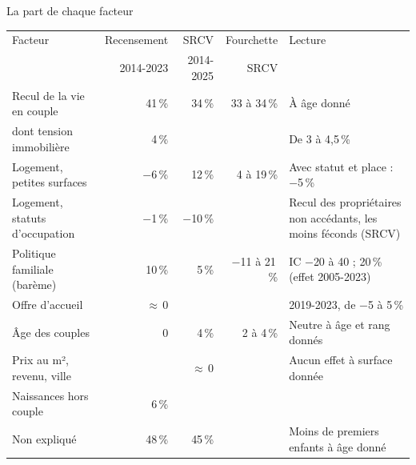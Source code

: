 \documentclass[10pt,aspectratio=169]{beamer}
\begin{document}
\begin{frame}{La part de chaque facteur}
  \centering\footnotesize\setlength{\tabcolsep}{3.5pt}
  \begin{tabular}{@{}lrrrp{}@{}}
    \toprule
    Facteur & Recensement & SRCV & Fourchette & Lecture \\
     & 2014-2023 & 2014-2025 & SRCV & \\
    \midrule
    Recul de la vie en couple & 41\,\% & 34\,\% & 33 à 34\,\% & À âge donné \\
    \quad dont tension immobilière & 4\,\% & & & De 3 à 4,5\,\% \\
    Logement, petites surfaces & $-$6\,\% & 12\,\% & 4 à 19\,\% & Avec statut et place : $-$5\,\% \\
    {\color{blue} Logement, statuts d'occupation} & $-$1\,\% & $-$10\,\% & & Recul des propriétaires non accédants, les moins féconds (SRCV) \\
    Politique familiale (barème) & 10\,\% & 5\,\% & {$-$\color{red}11 à 21\,\%}& IC $-$20 à 40 ; 20\,\% (effet 2005-2023) \\
    Offre d'accueil & $\approx$\,0 & & & 2019-2023, de $-$5 à 5\,\% \\
    Âge des couples & 0 & 4\,\% & 2 à 4\,\% & Neutre à âge et rang donnés \\
    Prix au m², revenu, ville & & $\approx$\,0 & & Aucun effet à surface donnée \\
    Naissances hors couple & 6\,\% & & & \\
    Non expliqué & 48\,\% & 45\,\% & & Moins de premiers enfants à âge donné \\
    \bottomrule
  \end{tabular}
\end{frame}
\end{document}
